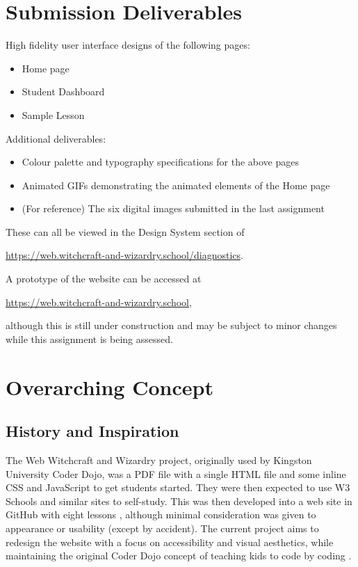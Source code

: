 \documentclass[a4paper, 12pt]{article}
\begin{document}
\section{Submission Deliverables}
High fidelity user interface designs of the following pages:
\begin{itemize}
    \item Home page
    \item Student Dashboard
    \item Sample Lesson
\end{itemize}
Additional deliverables:
\begin{itemize}
    \item Colour palette and typography specifications for the above pages
    \item Animated GIFs demonstrating the animated elements of the Home page
    \item (For reference) The six digital images submitted in the last assignment
\end{itemize}
These can all be viewed in the Design System section of

\url{https://web.witchcraft-and-wizardry.school/diagnostics}.

A prototype of the website can be accessed at 

\url{https://web.witchcraft-and-wizardry.school}, 

although this is still under construction and may be subject to minor changes while this assignment is being assessed.

\section{Overarching Concept}

\subsection{History and Inspiration}
The Web Witchcraft and Wizardry project, originally used by Kingston University Coder Dojo, was a PDF file with a single HTML file and some inline CSS and JavaScript to get students started. They were then expected to use W3 Schools \citep{w3schools2026} and similar sites to self-study. This was then developed into a web site in GitHub with eight lessons \citep{mulligan2024witchcraftandwizardry}, although minimal consideration was given to appearance or usability (except by accident). The current project aims to redesign the website with a focus on accessibility and visual aesthetics, while maintaining the original Coder Dojo concept of teaching kids to code by coding \citep{coderdojo2026}.
\end{document}
